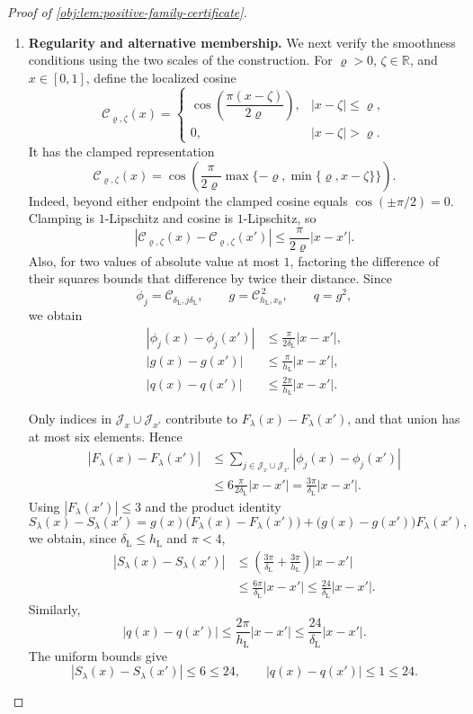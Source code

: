 \begin{proof}[Proof of \cref{obj:lem:positive-family-certificate}]
\begin{enumerate}
\item \textbf{Regularity and alternative membership.}
We next verify the smoothness conditions using the two scales of the
construction. For \(\varrho>0\), \(\zeta\in\mathbb R\), and
\(x\in[0,1]\), define the localized cosine
\[
\mathcal C_{\varrho,\zeta}(x)=
\begin{cases}
\cos\!\left(\dfrac{\pi(x-\zeta)}{2\varrho}\right),
   &|x-\zeta|\le\varrho,\\
0,&|x-\zeta|>\varrho.
\end{cases}
\]
It has the clamped representation
\[
\mathcal C_{\varrho,\zeta}(x)
=\cos\!\left(
 \frac{\pi}{2\varrho}
 \max\{-\varrho,\min\{\varrho,x-\zeta\}\}\right).
\]
Indeed, beyond either endpoint the clamped cosine equals
\(\cos(\pm\pi/2)=0\). Clamping is \(1\)-Lipschitz and cosine is
\(1\)-Lipschitz, so
\[
|\mathcal C_{\varrho,\zeta}(x)
 -\mathcal C_{\varrho,\zeta}(x')|
\le\frac{\pi}{2\varrho}|x-x'|.
\]
Also, for two values of absolute value at most \(1\), factoring the
difference of their squares bounds that difference by twice their
distance. Since
\[
\phi_j=\mathcal C_{\delta_{\mathrm L},j\delta_{\mathrm L}},
\qquad
g=\mathcal C_{h_{\mathrm L},x_0}^{\,2},
\qquad q=g^2,
\]
we obtain
\[
\begin{aligned}
|\phi_j(x)-\phi_j(x')|
 &\le\frac{\pi}{2\delta_{\mathrm L}}|x-x'|,\\
|g(x)-g(x')|
 &\le\frac{\pi}{h_{\mathrm L}}|x-x'|,\\
|q(x)-q(x')|
 &\le\frac{2\pi}{h_{\mathrm L}}|x-x'|.
\end{aligned}
\]

Only indices in \(\mathcal J_x\cup\mathcal J_{x'}\) contribute to
\(F_\lambda(x)-F_\lambda(x')\), and that union has at most six
elements. Hence
\[
\begin{aligned}
|F_\lambda(x)-F_\lambda(x')|
&\le\sum_{j\in\mathcal J_x\cup\mathcal J_{x'}}
                       |\phi_j(x)-\phi_j(x')|\\
&\le6\frac{\pi}{2\delta_{\mathrm L}}|x-x'|
=\frac{3\pi}{\delta_{\mathrm L}}|x-x'|.
\end{aligned}
\]
Using \(|F_\lambda(x')|\le3\) and the product identity
\[
S_\lambda(x)-S_\lambda(x')
=g(x)\bigl(F_\lambda(x)-F_\lambda(x')\bigr)
 +\bigl(g(x)-g(x')\bigr)F_\lambda(x'),
\]
we obtain, since \(\delta_{\mathrm L}\le h_{\mathrm L}\) and
\(\pi<4\),
\[
\begin{aligned}
|S_\lambda(x)-S_\lambda(x')|
&\le\left(\frac{3\pi}{\delta_{\mathrm L}}
                  +\frac{3\pi}{h_{\mathrm L}}\right)|x-x'|\\
&\le\frac{6\pi}{\delta_{\mathrm L}}|x-x'|
\le\frac{24}{\delta_{\mathrm L}}|x-x'|.
\end{aligned}
\]
Similarly,
\[
|q(x)-q(x')|
\le\frac{2\pi}{h_{\mathrm L}}|x-x'|
\le\frac{24}{\delta_{\mathrm L}}|x-x'|.
\]
The uniform bounds give
\[
|S_\lambda(x)-S_\lambda(x')|\le6\le24,
\qquad
|q(x)-q(x')|\le1\le24.
\]


\end{enumerate}
\end{proof}
